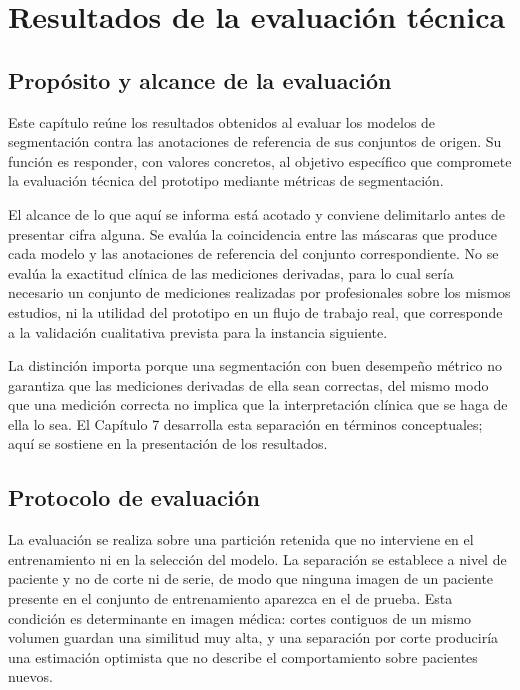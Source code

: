 \chapter{Resultados de la evaluación técnica}
\label{chap:resultados-evaluacion}

\section{Propósito y alcance de la evaluación}

Este capítulo reúne los resultados obtenidos al evaluar los modelos de segmentación contra las anotaciones de referencia de sus conjuntos de origen. Su función es responder, con valores concretos, al objetivo específico que compromete la evaluación técnica del prototipo mediante métricas de segmentación.

El alcance de lo que aquí se informa está acotado y conviene delimitarlo antes de presentar cifra alguna. Se evalúa la coincidencia entre las máscaras que produce cada modelo y las anotaciones de referencia del conjunto correspondiente. No se evalúa la exactitud clínica de las mediciones derivadas, para lo cual sería necesario un conjunto de mediciones realizadas por profesionales sobre los mismos estudios, ni la utilidad del prototipo en un flujo de trabajo real, que corresponde a la validación cualitativa prevista para la instancia siguiente.

La distinción importa porque una segmentación con buen desempeño métrico no garantiza que las mediciones derivadas de ella sean correctas, del mismo modo que una medición correcta no implica que la interpretación clínica que se haga de ella lo sea. El Capítulo 7 desarrolla esta separación en términos conceptuales; aquí se sostiene en la presentación de los resultados.

\section{Protocolo de evaluación}

La evaluación se realiza sobre una partición retenida que no interviene en el entrenamiento ni en la selección del modelo. La separación se establece a nivel de paciente y no de corte ni de serie, de modo que ninguna imagen de un paciente presente en el conjunto de entrenamiento aparezca en el de prueba. Esta condición es determinante en imagen médica: cortes contiguos de un mismo volumen guardan una similitud muy alta, y una separación por corte produciría una estimación optimista que no describe el comportamiento sobre pacientes nuevos.

